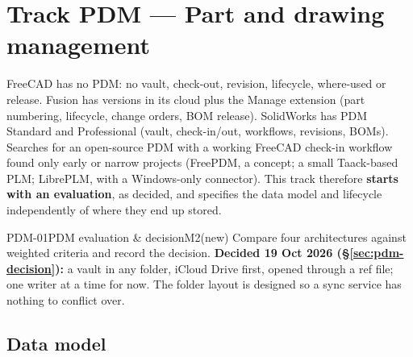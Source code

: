 \section{Track PDM --- Part and drawing management}\label{sec:pdm}

FreeCAD has no PDM: no vault, check-out, revision, lifecycle, where-used or release. Fusion has
versions in its cloud plus the Manage extension (part numbering, lifecycle, change orders, BOM release).
SolidWorks has PDM Standard and Professional (vault, check-in/out, workflows, revisions, BOMs). Searches
for an open-source PDM with a working FreeCAD check-in workflow found only early or narrow projects
(FreePDM, a concept; a small Taack-based PLM; LibrePLM, with a Windows-only connector). This track
therefore \textbf{starts with an evaluation}, as decided, and specifies the data model and lifecycle
independently of where they end up stored.

\begin{epic}{PDM-01}{PDM evaluation \& decision}{M2}{\stDone}{(new)}
Compare four architectures against weighted criteria and record the decision. \textbf{Decided 19 Oct 2026
(\S\ref{sec:pdm-decision}):} a vault in any folder, iCloud Drive first, opened through a  ref file;
one writer at a time for now. The folder layout is designed so a sync service has nothing to conflict over.
\end{epic}



\subsection{Data model}

